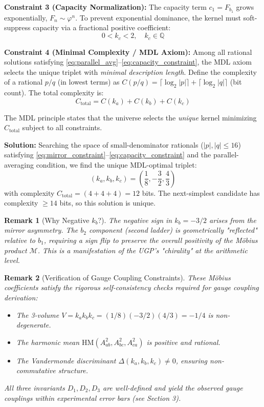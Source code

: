 \documentclass[11pt,twocolumn]{article}
\newtheorem{remark}{Remark}[section]
\begin{document}
\textbf{Constraint 3 (Capacity Normalization):}
The capacity term $c_1 = F_{b_1}$ grows exponentially, $F_n \sim \varphi^n$. To prevent exponential dominance, the kernel must soft-suppress capacity via a fractional positive coefficient:
\begin{equation}
0 < k_c < 2, \quad k_c \in \mathbb{Q}
\label{eq:capacity_constraint}
\end{equation}

\textbf{Constraint 4 (Minimal Complexity / MDL Axiom):}
Among all rational solutions satisfying \eqref{eq:parallel_avg}--\eqref{eq:capacity_constraint}, the MDL axiom selects the unique triplet with \emph{minimal description length}. Define the complexity of a rational $p/q$ (in lowest terms) as $C(p/q) = \lceil\log_2|p|\rceil + \lceil\log_2|q|\rceil$ (bit count). The total complexity is:
\[
C_{\text{total}} = C(k_a) + C(k_b) + C(k_c)
\]

The MDL principle states that the universe selects the \emph{unique} kernel minimizing $C_{\text{total}}$ subject to all constraints.

\textbf{Solution:}
Searching the space of small-denominator rationals ($|p|, |q| \leq 16$) satisfying \eqref{eq:mirror_constraint}--\eqref{eq:capacity_constraint} and the parallel-averaging condition, we find the unique MDL-optimal triplet:
\[
\boxed{(k_a, k_b, k_c) = \left(\frac{1}{8}, -\frac{3}{2}, \frac{4}{3}\right)}
\]
with complexity $C_{\text{total}} = (4 + 4 + 4) = 12$ bits. The next-simplest candidate has complexity $\geq 14$ bits, so this solution is unique.

\begin{remark}[Why Negative $k_b$?]
The negative sign in $k_b = -3/2$ arises from the mirror asymmetry. The $b_2$ component (second ladder) is geometrically "reflected" relative to $b_1$, requiring a sign flip to preserve the overall positivity of the Möbius product $\mathcal{M}$. This is a manifestation of the UGP's "chirality" at the arithmetic level.
\end{remark}

\begin{remark}[Verification of Gauge Coupling Constraints]
These Möbius coefficients satisfy the rigorous self-consistency checks required for gauge coupling derivation:
\begin{itemize}[itemsep=0.1em]
\item The 3-volume $V = k_a k_b k_c = (1/8)(-3/2)(4/3) = -1/4$ is non-degenerate.
\item The harmonic mean $\text{HM}(A_{ab}^2, A_{bc}^2, A_{ca}^2)$ is positive and rational.
\item The Vandermonde discriminant $\Delta(k_a, k_b, k_c) \neq 0$, ensuring non-commutative structure.
\end{itemize}
All three invariants $D_1, D_2, D_3$ are well-defined and yield the observed gauge couplings within experimental error bars (see Section 3).
\end{remark}
\end{document}
